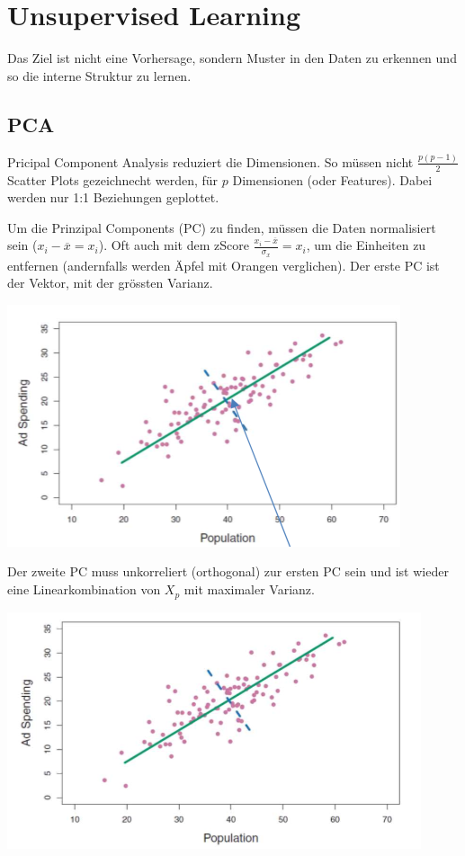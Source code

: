 \section{Unsupervised Learning}
Das Ziel ist nicht eine Vorhersage, sondern Muster in den Daten zu erkennen und so die interne Struktur zu lernen.

\subsection{PCA}
Pricipal Component Analysis reduziert die Dimensionen. So müssen nicht $\frac{p(p-1)}{2}$ Scatter Plots gezeichnecht werden, für $p$ Dimensionen (oder Features). Dabei werden nur 1:1 Beziehungen geplottet.

Um die Prinzipal Components (PC) zu finden, müssen die Daten normalisiert sein ($x_i - \overline{x}= x_i$). Oft auch mit dem zScore $\frac{x_i - \overline{x}}{\sigma_x}= x_i$, um die Einheiten zu entfernen (andernfalls werden Äpfel mit Orangen verglichen). Der erste PC ist der Vektor, mit der grössten Varianz.
\begin{center}
	\includegraphics[width=0.7\columnwidth]{Images/pc}
\end{center}
Der zweite PC muss unkorreliert (orthogonal) zur ersten PC sein und ist wieder eine Linearkombination von $X_p$ mit maximaler Varianz.
\begin{center}
	\includegraphics[width=0.7\columnwidth]{Images/pc2}
\end{center}


